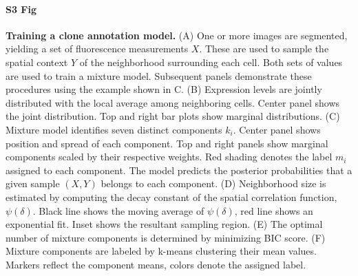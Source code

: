 \documentclass[10pt,letterpaper]{article}
\begin{document}
\paragraph*{S3 Fig} 
\label{S3_Fig} 
{\bf Training a clone annotation model.} (A) One or more images are segmented, yielding a set of fluorescence measurements $X$. These are used to sample the spatial context $Y$ of the neighborhood surrounding each cell. Both sets of values are used to train a mixture model. Subsequent panels demonstrate these procedures using the example shown in   C. (B) Expression levels are jointly distributed with the local average among neighboring cells. Center panel shows the joint distribution. Top and right bar plots show marginal distributions. (C) Mixture model identifies seven distinct components $k_i$. Center panel shows position and spread of each component. Top and right panels show marginal components scaled by their respective weights. Red shading denotes the label $m_i$ assigned to each component. The model predicts the posterior probabilities that a given sample $(X,Y)$ belongs to each component. (D) Neighborhood size is estimated by computing the decay constant of the spatial correlation function, $\psi(\delta)$. Black line shows the moving average of $\psi(\delta)$, red line shows an exponential fit. Inset shows the resultant sampling region. (E) The optimal number of mixture components is determined by minimizing BIC score. (F) Mixture components are labeled by k-means clustering their mean values. Markers reflect the component means, colors denote the assigned label.
\end{document}
